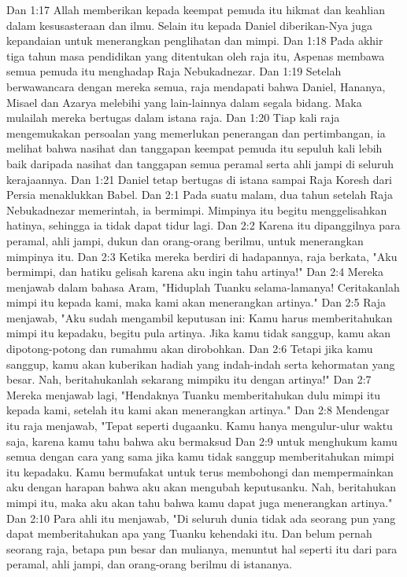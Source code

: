 Dan 1:17  Allah memberikan kepada keempat pemuda itu hikmat dan keahlian dalam kesusasteraan dan ilmu. Selain itu kepada Daniel diberikan-Nya juga kepandaian untuk menerangkan penglihatan dan mimpi.
Dan 1:18  Pada akhir tiga tahun masa pendidikan yang ditentukan oleh raja itu, Aspenas membawa semua pemuda itu menghadap Raja Nebukadnezar.
Dan 1:19  Setelah berwawancara dengan mereka semua, raja mendapati bahwa Daniel, Hananya, Misael dan Azarya melebihi yang lain-lainnya dalam segala bidang. Maka mulailah mereka bertugas dalam istana raja.
Dan 1:20  Tiap kali raja mengemukakan persoalan yang memerlukan penerangan dan pertimbangan, ia melihat bahwa nasihat dan tanggapan keempat pemuda itu sepuluh kali lebih baik daripada nasihat dan tanggapan semua peramal serta ahli jampi di seluruh kerajaannya.
Dan 1:21  Daniel tetap bertugas di istana sampai Raja Koresh dari Persia menaklukkan Babel.
Dan 2:1  Pada suatu malam, dua tahun setelah Raja Nebukadnezar memerintah, ia bermimpi. Mimpinya itu begitu menggelisahkan hatinya, sehingga ia tidak dapat tidur lagi.
Dan 2:2  Karena itu dipanggilnya para peramal, ahli jampi, dukun dan orang-orang berilmu, untuk menerangkan mimpinya itu.
Dan 2:3  Ketika mereka berdiri di hadapannya, raja berkata, "Aku bermimpi, dan hatiku gelisah karena aku ingin tahu artinya!"
Dan 2:4  Mereka menjawab dalam bahasa Aram, "Hiduplah Tuanku selama-lamanya! Ceritakanlah mimpi itu kepada kami, maka kami akan menerangkan artinya."
Dan 2:5  Raja menjawab, "Aku sudah mengambil keputusan ini: Kamu harus memberitahukan mimpi itu kepadaku, begitu pula artinya. Jika kamu tidak sanggup, kamu akan dipotong-potong dan rumahmu akan dirobohkan.
Dan 2:6  Tetapi jika kamu sanggup, kamu akan kuberikan hadiah yang indah-indah serta kehormatan yang besar. Nah, beritahukanlah sekarang mimpiku itu dengan artinya!"
Dan 2:7  Mereka menjawab lagi, "Hendaknya Tuanku memberitahukan dulu mimpi itu kepada kami, setelah itu kami akan menerangkan artinya."
Dan 2:8  Mendengar itu raja menjawab, "Tepat seperti dugaanku. Kamu hanya mengulur-ulur waktu saja, karena kamu tahu bahwa aku bermaksud
Dan 2:9  untuk menghukum kamu semua dengan cara yang sama jika kamu tidak sanggup memberitahukan mimpi itu kepadaku. Kamu bermufakat untuk terus membohongi dan mempermainkan aku dengan harapan bahwa aku akan mengubah keputusanku. Nah, beritahukan mimpi itu, maka aku akan tahu bahwa kamu dapat juga menerangkan artinya."
Dan 2:10  Para ahli itu menjawab, "Di seluruh dunia tidak ada seorang pun yang dapat memberitahukan apa yang Tuanku kehendaki itu. Dan belum pernah seorang raja, betapa pun besar dan mulianya, menuntut hal seperti itu dari para peramal, ahli jampi, dan orang-orang berilmu di istananya.
